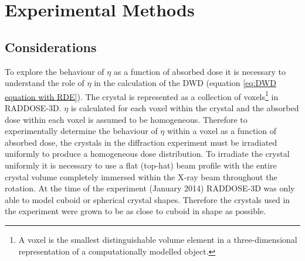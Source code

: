 \section{Experimental Methods}
\label{sec:Experimental Methods}

\subsection{Considerations}
\label{sub:Considerations}
To explore the behaviour of $\eta$ as a function of absorbed dose it is necessary to understand the role of $\eta$ in the calculation of the DWD (equation \ref{eq:DWD equation with RDE}).
The crystal is represented as a collection of voxels\footnote{A voxel is the smallest distinguishable volume element in a three-dimensional representation of a computationally modelled object.} in RADDOSE-3D.
$\eta$ is calculated for each voxel within the crystal and the absorbed dose within each voxel is assumed to be homogeneous.
Therefore to experimentally determine the behaviour of $\eta$ within a voxel as a function of absorbed dose, the crystals in the diffraction experiment must be irradiated uniformly to produce a homogeneous dose distribution.
To irradiate the crystal uniformly it is necessary to use a flat (top-hat) beam profile with the entire crystal volume completely immersed within the X-ray beam throughout the rotation.
At the time of the experiment (January 2014) RADDOSE-3D was only able to model cuboid or spherical crystal shapes.
Therefore the crystals used in the experiment were grown to be as close to cuboid in shape as possible.

